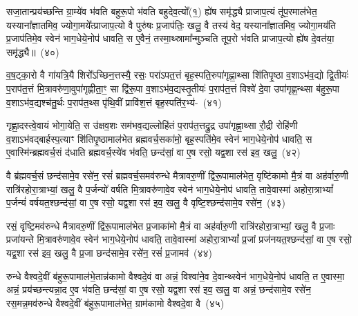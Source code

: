 सजा॒तान्प्रय॑च्छन्ति ग्रा॒म्ये॑व भ॑वति बहुरू॒पो भ॑वति बहुदेव॒त्यो᳚(१॒) ह्ये॑ष समृ॑द्ध्यै प्राजाप॒त्यं तू॑प॒रमा\-ल॑भेत॒ यस्याना᳚ज्ञातमिव॒ ज्योगा॒मये᳚त्प्राजाप॒त्यो वै पुरु॑षः प्र॒जा\-प॑तिः॒ खलु॒ वै तस्य॑ वेद॒ यस्याना᳚ज्ञातमिव॒ ज्योगा॒मय॑ति प्र॒जा\-प॑तिमे॒व स्वेन॑ भाग॒\-धेये॒नोप॑ धावति॒ स ए॒वैनं॒ तस्मा॒थ्स्रामा᳚न्मुञ्चति तूप॒रो भ॑वति प्राजाप॒त्यो ह्ये॑ष दे॒वत॑या॒ समृ॑द्ध्यै॥~(४०)\ip

{\anuvakamend[{अ॒स्मा॒ इन्द्र॑मे॒वैष स॑जा॒ता विश्वा॑ने॒व दे॒वान्थ्स्वेन॑ भाग॒\-धेये॒नोप॑ धावति॒ त ए॒वास्मै᳚ प्राजाप॒त्यो हि त्रीणि॑ च}]}

व॒ष॒ट्का॒रो वै गा॑यत्रि॒यै शिरो᳚\-ऽच्छिन॒त्तस्यै॒ रसः॒ परा॑\-ऽपत॒त्तं बृह॒स्पति॒रुपा॑गृह्णा॒थ्सा शि॑तिपृ॒ष्ठा व॒शा\-ऽभ॑व॒द्यो द्वि॒तीयः॑ प॒राप॑त॒त्तं मि॒त्रावरु॑णा॒वुपा॑गृह्णीता॒ꣳ॒ सा द्वि॑रू॒पा व॒शा\-ऽभ॑व॒द्यस्तृ॒तीयः॑ प॒राप॑त॒त्तं विश्वे॑ दे॒वा उपा॑गृह्ण॒न्थ्सा ब॑हुरू॒पा व॒शा\-ऽभ॑व॒द्यश्च॑तु॒र्थः प॒राप॑त॒थ्स पृ॑थि॒वीं प्रावि॑श॒त्तं बृह॒स्पति॑र॒भ्य॑-~(४१)\ip

गृह्णा॒दस्त्वे॒वायं भोगा॒येति॒ स उ॑क्षव॒शः सम॑भव॒द्यल्लोहि॑तं प॒राप॑त॒त्तद्रु॒द्र उपा॑गृह्णा॒थ्सा रौ॒द्री रोहि॑णी व॒शा\-ऽभ॑व\-द्बार्\mbox{}हस्प॒त्याꣳ शि॑तिपृ॒ष्ठामाल॑भेत ब्रह्मवर्च॒सका॑मो॒ बृह॒स्पति॑मे॒व स्वेन॑ भाग॒\-धेये॒नोप॑ धावति॒ स ए॒वास्मि॑न्ब्रह्म\-वर्च॒सं द॑धाति ब्रह्मवर्च॒स्ये॑व भ॑वति॒ छन्द॑सां॒ वा ए॒ष रसो॒ यद्व॒शा रस॑ इव॒ खलु॒~(४२)\ip

वै ब्र॑ह्मवर्च॒सं छन्द॑सामे॒व रसे॑न॒ रसं॑ ब्रह्मवर्च॒समव॑\-रुन्धे मैत्रावरु॒णीं द्वि॑रू॒पामा\-ल॑भेत॒ वृष्टि॑कामो मै॒त्रं वा अह॑र्वारु॒णी रात्रि॑रहोरा॒त्राभ्यां॒ खलु॒ वै प॒र्जन्यो॑ वर्\mbox{}षति मि॒त्रावरु॑णावे॒व स्वेन॑ भाग॒\-धेये॒नोप॑ धावति॒ तावे॒वास्मा॑ अहोरा॒त्रा\-भ्यां᳚ प॒र्जन्यं॑ वर्\mbox{}षयत॒श्छन्द॑सां॒ वा ए॒ष रसो॒ यद्व॒शा रस॑ इव॒ खलु॒ वै वृष्टि॒श्छन्द॑सामे॒व रसे॑न॒~(४३)\ip

रसं॒ वृष्टि॒मव॑\-रुन्धे मैत्रावरु॒णीं द्वि॑रू॒पामाल॑भेत प्र॒जाका॑मो मै॒त्रं वा अह॑र्वारु॒णी रात्रि॑रहोरा॒त्राभ्यां॒ खलु॒ वै प्र॒जाः प्रजा॑यन्ते मि॒त्रावरु॑णावे॒व स्वेन॑ भाग॒\-धेये॒नोप॑ धावति॒ तावे॒वास्मा॑ अहोरा॒त्रा\-भ्यां᳚ प्र॒जां प्रज॑नयत॒श्छन्द॑सां॒ वा ए॒ष रसो॒ यद्व॒शा रस॑ इव॒ खलु॒ वै प्र॒जा छन्द॑सामे॒व रसे॑न॒ रसं॑ प्र॒जामव॑~(४४)\ip

रुन्धे वैश्वदे॒वीं ब॑हुरू॒पामाल॑भे॒तान्न॑कामो वैश्वदे॒वं वा अन्नं॒ विश्वा॑ने॒व दे॒वान्थ्स्वेन॑ भाग॒\-धेये॒नोप॑ धावति॒ त ए॒वास्मा॒ अन्नं॒ प्रय॑च्छन्त्यन्ना॒द ए॒व भ॑वति॒ छन्द॑सां॒ वा ए॒ष रसो॒ यद्व॒शा रस॑ इव॒ खलु॒ वा अन्नं॒ छन्द॑सामे॒व रसे॑न॒ रस॒मन्न॒मव॑\-रुन्धे वैश्वदे॒वीं ब॑हुरू॒पामा\-ल॑भेत॒ ग्राम॑कामो वैश्वदे॒वा वै~(४५)\ip

